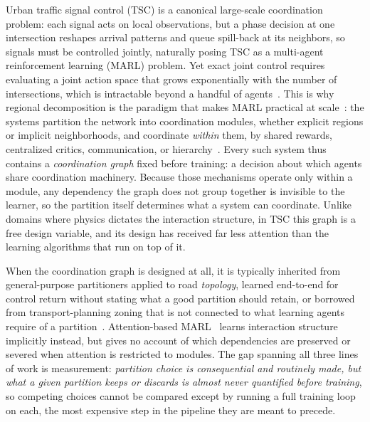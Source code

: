 \documentclass[journal]{IEEEtran}
\theoremstyle{definition}
\begin{document}
Urban traffic signal control (TSC) is a canonical large-scale coordination problem: each signal acts on local observations, but a phase decision at one intersection reshapes arrival patterns and queue spill-back at its neighbors, so signals must be controlled jointly, naturally posing TSC as a multi-agent reinforcement learning (MARL) problem. Yet exact joint control requires evaluating a joint action space that grows exponentially with the number of intersections, which is intractable beyond a handful of agents~\citep{nair2005ndpomdp,kok2006ndpomdp,oliehoek2012ndpomdp}. This is why regional decomposition is the paradigm that makes MARL practical at scale~\citep{qu2020average,qu2022scalable}: the systems partition the network into coordination modules, whether explicit regions or implicit neighborhoods, and coordinate \emph{within} them, by shared rewards, centralized critics, communication, or hierarchy~\citep{ma2020fma2c,wei2019colight,xu2021hilight,zhu2026halo}. Every such system thus contains a \emph{coordination graph} fixed before training: a decision about which agents share coordination machinery. Because those mechanisms operate only within a module, any dependency the graph does not group together is invisible to the learner, so the partition itself determines what a system can coordinate. Unlike domains where physics dictates the interaction structure, in TSC this graph is a free design variable, and its design has received far less attention than the learning algorithms that run on top of it.

When the coordination graph is designed at all, it is typically inherited from general-purpose partitioners applied to road \emph{topology}, learned end-to-end for control return without stating what a good partition should retain, or borrowed from transport-planning zoning that is not connected to what learning agents require of a partition~\citep{laplacian2009ieee,communitydetection2021plosone,liu2023gplight,ma2022feudal,odflow2019partition,mfdpartition2020}.
Attention-based MARL~\citep{jiang2018atoc,wei2019colight} learns interaction structure implicitly instead, but gives no account of which dependencies are preserved or severed when attention is restricted to modules.
The gap spanning all three lines of work is measurement: \emph{partition choice is consequential and routinely made, but what a given partition keeps or discards is almost never quantified before training}, so competing choices cannot be compared except by running a full training loop on each, the most expensive step in the pipeline they are meant to precede.
\end{document}
